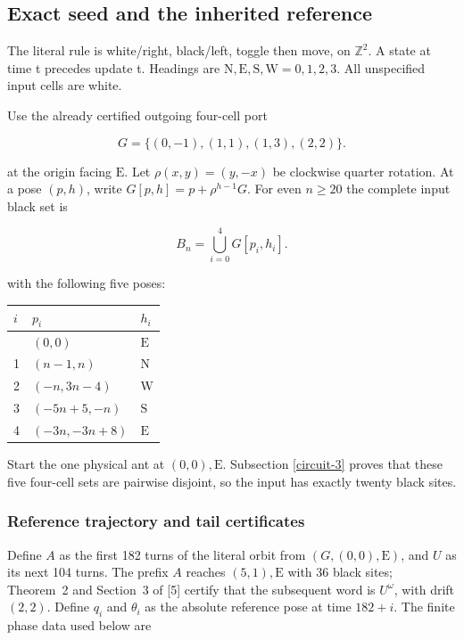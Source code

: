 \documentclass[
  11pt,
]{article}
\begin{document}
\subsection{Exact seed and the inherited reference}\label{circuit-2}

The literal rule is white/right, black/left, toggle then move, on
$\mathbb Z^2$. A state at time t precedes update t. Headings are
$\mathrm N,\mathrm E,\mathrm S,\mathrm W=0,1,2,3$. All unspecified input cells are white.

Use the already certified outgoing four-cell port

\[
G=\{(0,-1),(1,1),(1,3),(2,2)\}.
\]

at the origin facing \(\mathrm E\). Let \(\rho(x,y)=(y,-x)\) be clockwise
quarter rotation. At a pose
\((p,h)\), write $G[p,h]=p+\rho^{h-1}G$. For even $n\ge20$ the
complete input black set is

\[
B_n=\bigcup_{i=0}^4G[p_i,h_i].
\]

with the following five poses:

\begin{longtable}[]{@{}lll@{}}
\toprule\noalign{}
$i$ & $p_i$ & $h_i$ \\
\midrule\noalign{}
\endhead
\bottomrule\noalign{}
\endlastfoot
0 & $(0,0)$ & $\mathrm E$ \\
1 & $(n-1,n)$ & $\mathrm N$ \\
2 & $(-n,3n-4)$ & $\mathrm W$ \\
3 & $(-5n+5,-n)$ & $\mathrm S$ \\
4 & $(-3n,-3n+8)$ & $\mathrm E$ \\
\end{longtable}

Start the one physical ant at \((0,0),\mathrm E\). Subsection \ref{circuit-3} proves
that these five four-cell sets are pairwise disjoint, so the input has
exactly twenty black sites.

\subsubsection{Reference trajectory and tail certificates}\label{reference-data-checked-rather-than-inferred-from-a-long-run}

Define \(A\) as the first 182 turns of the literal orbit from
\((G,(0,0),\mathrm E)\), and \(U\) as its next 104 turns.
The prefix \(A\) reaches \((5,1),\mathrm E\) with 36 black sites;
Theorem~2 and Section~3 of {[}5{]} certify that the subsequent word is
\(U^\omega\), with drift \((2,2)\). Define \(q_i\) and \(\theta_i\) as the
absolute reference pose at time \(182+i\). The finite phase data used below
are
\end{document}
